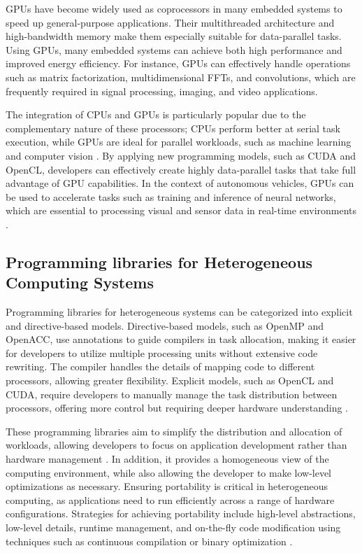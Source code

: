 GPUs have become widely used as coprocessors in many embedded systems to speed up general-purpose applications. Their multithreaded architecture and high-bandwidth memory make them especially suitable for data-parallel tasks. Using GPUs, many embedded systems can achieve both high performance and improved energy efficiency. For instance, GPUs can effectively handle operations such as matrix factorization, multidimensional FFTs, and convolutions, which are frequently required in signal processing, imaging, and video applications. \cite{li2021}

The integration of CPUs and GPUs is particularly popular due to the complementary nature of these processors; CPUs perform better at serial task execution, while GPUs are ideal for parallel workloads, such as machine learning and computer vision \cite{Han2021}. By applying new programming models, such as CUDA and OpenCL, developers can effectively create highly data-parallel tasks that take full advantage of GPU capabilities. In the context of autonomous vehicles, GPUs can be used to accelerate tasks such as training and inference of neural networks, which are essential to processing visual and sensor data in real-time environments \cite{Hazarika2020}.

\subsection{Programming libraries for Heterogeneous Computing Systems}

Programming libraries for heterogeneous systems can be categorized into explicit and directive-based models. Directive-based models, such as OpenMP and OpenACC, use annotations to guide compilers in task allocation, making it easier for developers to utilize multiple processing units without extensive code rewriting. The compiler handles the details of mapping code to different processors, allowing greater flexibility. Explicit models, such as OpenCL and CUDA, require developers to manually manage the task distribution between processors, offering more control but requiring deeper hardware understanding \cite{Terzo2019}.

These programming libraries aim to simplify the distribution and allocation of workloads, allowing developers to focus on application development rather than hardware management \cite{Brandejsky2022}. In addition, it provides a homogeneous view of the computing environment, while also allowing the developer to make low-level optimizations as necessary. Ensuring portability is critical in heterogeneous computing, as applications need to run efficiently across a range of hardware configurations. Strategies for achieving portability include high-level abstractions, low-level details, runtime management, and on-the-fly code modification using techniques such as continuous compilation or binary optimization \cite{Zahran2019}.

